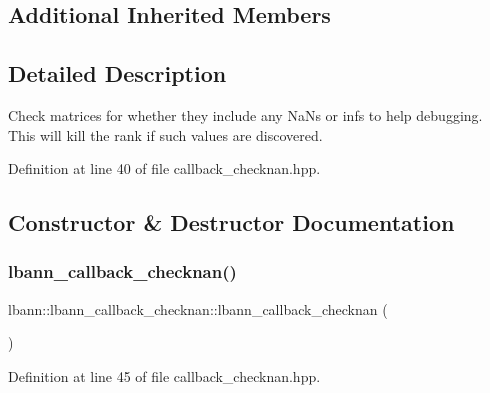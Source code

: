 \subsection*{Additional Inherited Members}


\subsection{Detailed Description}
Check matrices for whether they include any Na\+Ns or infs to help debugging. This will kill the rank if such values are discovered. 

Definition at line 40 of file callback\+\_\+checknan.\+hpp.



\subsection{Constructor \& Destructor Documentation}
\mbox{\label{classlbann_1_1lbann__callback__checknan_a62c093e4f67a4b387dee11fe41b5ec2f}} 
\subsubsection{\texorpdfstring{lbann\+\_\+callback\+\_\+checknan()}{lbann\_callback\_checknan()}\hspace{0.1cm}{\footnotesize\ttfamily [1/2]}}
{\footnotesize\ttfamily lbann\+::lbann\+\_\+callback\+\_\+checknan\+::lbann\+\_\+callback\+\_\+checknan (\begin{DoxyParamCaption}{ }\end{DoxyParamCaption})\hspace{0.3cm}{\ttfamily [inline]}}



Definition at line 45 of file callback\+\_\+checknan.\+hpp.


